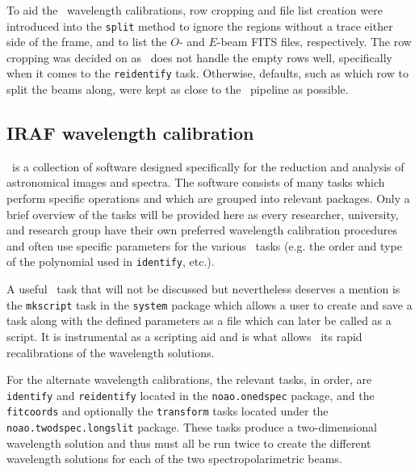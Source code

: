 To aid the \iraf\ wavelength calibrations, row cropping and file list creation were introduced into the \texttt{split} method to ignore the regions without a trace either side of the frame, and to list the $O$- and $E$-beam \gls{FITS} files, respectively. The row cropping was decided on as \iraf\ does not handle the empty rows well, specifically when it comes to the \texttt{reidentify} task. Otherwise, defaults, such as which row to split the beams along, were kept as close to the \polsalt\ pipeline as possible.


\subsection{IRAF wavelength calibration}\label{subsec:IRAF_wav_cal}

\iraf\ is a collection of software designed specifically for the reduction and analysis of astronomical images and spectra. The software consists of many tasks which perform specific operations and which are grouped into relevant packages. Only a brief overview of the tasks will be provided here as every researcher, university, and research group have their own preferred wavelength calibration procedures and often use specific parameters for the various \iraf\ tasks (e.g. the order and type of the polynomial used in \texttt{identify}, etc.).
\prgph

A useful \iraf\ task that will not be discussed but nevertheless deserves a mention is the \texttt{mkscript} task in the \texttt{system} package which allows a user to create and save a task along with the defined parameters as a file which can later be called as a script. It is instrumental as a scripting aid and is what allows \iraf\ its rapid recalibrations of the wavelength solutions.
\prgph

For the alternate wavelength calibrations, the relevant tasks, in order, are \texttt{identify} and \texttt{reidentify} located in the \texttt{noao.onedspec} package, and the \texttt{fitcoords} and optionally the \texttt{transform} tasks located under the \texttt{noao.twodspec.longslit} package. These tasks produce a two-dimensional wavelength solution and thus must all be run twice to create the different wavelength solutions for each of the two spectropolarimetric beams.

